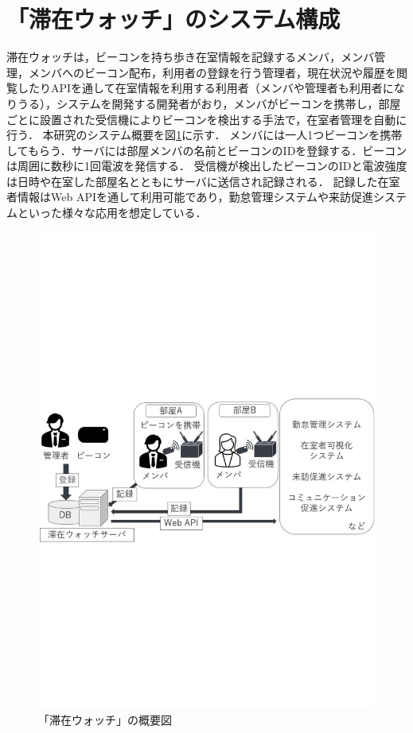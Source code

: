 

\section{「滞在ウォッチ」のシステム構成}\label{3.1}
滞在ウォッチは，ビーコンを持ち歩き在室情報を記録するメンバ，メンバ管理，メンバへのビーコン配布，利用者の登録を行う管理者，現在状況や履歴を閲覧したりAPIを通して在室情報を利用する利用者（メンバや管理者も利用者になりうる），システムを開発する開発者がおり，メンバがビーコンを携帯し，部屋ごとに設置された受信機によりビーコンを検出する手法で，在室者管理を自動に行う．
本研究のシステム概要を図\ref{StayWatchOverview}に示す．
メンバには一人1つビーコンを携帯してもらう．サーバには部屋メンバの名前とビーコンのIDを登録する．ビーコンは周囲に数秒に1回電波を発信する．
受信機が検出したビーコンのIDと電波強度は日時や在室した部屋名とともにサーバに送信され記録される．
記録した在室者情報はWeb APIを通して利用可能であり，勤怠管理システムや来訪促進システムといった様々な応用を想定している．

\begin{figure}[h]
  \centering  %
  \includegraphics[clip,scale = 0.6]{image/system.pdf}
  \caption{「滞在ウォッチ」の概要図}    \label{StayWatchOverview}
\end{figure}

